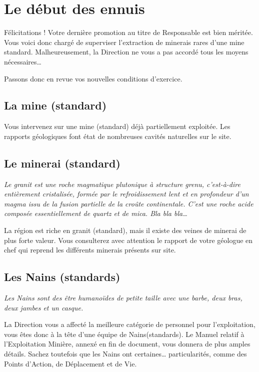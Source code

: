 
\newpage

\section{Le début des ennuis}

Félicitations ! Votre dernière promotion au titre de Responsable est bien méritée. Vous voici donc chargé de superviser l'extraction de minerais rares d'une mine standard. Malheureusement, la Direction ne vous a pas accordé tous les moyens nécessaires\ldots{}

Passons donc en revue vos nouvelles conditions d'exercice.

\subsection{La mine (standard)}
Vous intervenez sur une mine (standard) déjà partiellement exploitée. Les rapports géologiques font état de nombreuses cavités naturelles sur le site.

\subsection{Le minerai (standard)}
\textit{Le granit est une roche magmatique plutonique à structure grenu, c'est-à-dire entièrement cristalisée, formée par le refroidissement lent et en profondeur d'un magma issu de la fusion partielle de la croûte continentale. C'est une roche acide composée essentiellement de quartz et de mica. Bla bla bla\ldots{}}

La région est riche en granit (standard), mais il existe des veines de minerai de plus forte valeur. Vous consulterez avec attention le rapport de votre géologue en chef qui reprend les différents minerais présents sur site.

\subsection{Les Nains (standards)}
\textit{Les Nains sont des être humanoïdes de petite taille avec une barbe, deux bras, deux jambes et un casque.}

La Direction vous a affecté la meilleure catégorie de personnel pour l'exploitation, vous êtes donc à la tête d'une équipe de Nains(standards). Le Manuel relatif à l'Exploitation Minière, annexé en fin de document, vous donnera de plus amples détails. Sachez toutefois que les Nains ont certaines\ldots{} particularités, comme des Points d'Action, de Déplacement et de Vie.

